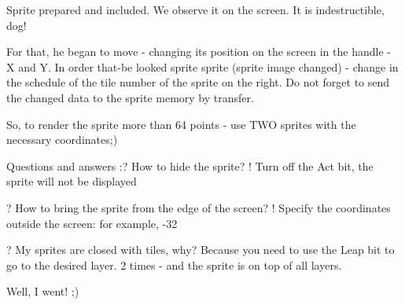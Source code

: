 Sprite prepared and included. We observe it on the screen. It is indestructible, dog! 

For that, he began to move - changing its position on the screen in the handle - X and Y. 
In order that-be looked sprite sprite (sprite image changed) - change in the schedule of the tile number of the sprite on the right. 
Do not forget to send the changed data to the sprite memory by transfer. 

So, to render the sprite more than 64 points - use TWO sprites with the necessary coordinates;) 

Questions and answers 
:? How to hide the sprite? 
! Turn off the Act bit, the sprite will not be displayed 

? How to bring the sprite from the edge of the screen? 
! Specify the coordinates outside the screen: for example, -32 

? My sprites are closed with tiles, why?
Because you need to use the Leap bit to go to the desired layer. 2 times - and the sprite is on top of all layers. 

Well, I went! ;)
